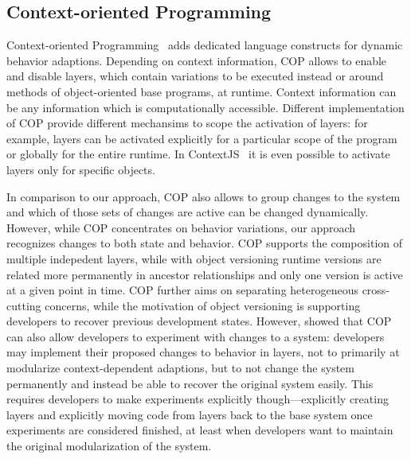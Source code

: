 

\subsection{Context-oriented Programming}

Context-oriented Programming~\cite{Hirschfeld2008COP} adds dedicated language constructs for dynamic behavior adaptions.
Depending on context information, COP allows to enable and disable layers, which contain variations to be executed instead or around methods of object-oriented base programs, at runtime.
Context information can be any information which is computationally accessible.
Different implementation of COP provide different mechansims to scope the activation of layers: for example, layers can be activated explicitly for a particular scope of the program or globally for the entire runtime.
In ContextJS~\cite{Lincke2011OIC} it is even possible to activate layers only for specific objects.

In comparison to our approach, COP also allows to group changes to the system and which of those sets of changes are active can be changed dynamically.
However, while COP concentrates on behavior variations, our approach recognizes changes to both state and behavior.
COP supports the composition of multiple indepedent layers, while with object versioning runtime versions are related more permanently in ancestor relationships and only one version is active at a given point in time.
COP further aims on separating heterogeneous cross-cutting concerns, while the motivation of object versioning is supporting developers to recover previous development states.
However, \cite{Lincke2012SCS} showed that COP can also allow developers to experiment with changes to a system: developers may implement their proposed changes to behavior in layers, not to primarily at modularize context-dependent adaptions, but to not change the system permanently and instead be able to recover the original system easily.
This requires developers to make experiments explicitly though---explicitly creating layers and explicitly moving code from layers back to the base system once experiments are considered finished, at least when developers want to maintain the original modularization of the system.


